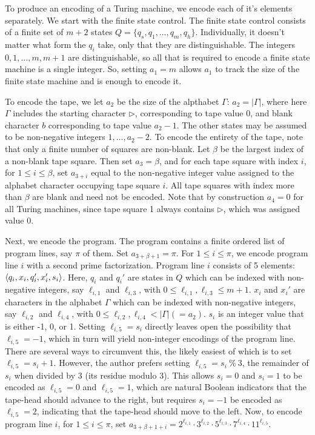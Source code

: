 To produce an encoding of a Turing machine, we encode each of it's elements separately.  We start with the finite state control.  The finite state control consists of a finite set of $m+2$ states $Q = \{q_s, q_1, \ldots, q_m, q_h\}$.  Individually, it doesn't matter what form the $q_i$ take, only that they are distinguishable.  The integers $0, 1,\ldots, m, m+1$ are distinguishable, so all that is required to encode a finite state machine is a single integer.  So, setting $a_1=m$  allows $a_1$ to track the size of the finite state machine and is enough to encode it.

To encode the tape, we let $a_2$ be the size of the alpthabet $\Gamma$: $a_2 = |\Gamma|$, where here $\Gamma$  includes the starting character $\triangleright$, corresponding to tape value 0, and blank character $b$ corresponding to tape value $a_2-1$.  The other states may be assumed to be non-negative integers $1, \ldots, a_2-2$.  To encode the entirety of the tape, note that only a finite number of squares are non-blank.  Let $\beta$ be the largest index of a non-blank tape square.  Then set $a_3 = \beta$, and for each tape square with index $i$, for $1\leq i\leq \beta$, set $a_{3+i}$ equal to the non-negative integer value assigned to the alphabet character occupying tape square $i$.  All tape squares with index more than $\beta$ are blank and need not be encoded.   Note that by construction $a_4=0$ for all Turing machines, since tape square 1 always contains $\triangleright$, which was assigned value 0.  

Next, we encode the program.    The program contains a finite ordered list of program lines, say $\pi$ of them.  Set $a_{3+\beta+1} = \pi$.  For $1\leq i \leq \pi$, we encode program line $i$ with a second prime factorization. Program line $i$ consists of 5 elements: $\braket{q_i, x_i, q_i', x_i', s_i}$.  Here, $q_i$ and $q_i'$ are states in $Q$ which can be indexed with non-negative integers, say $\ell_{i,1}$ and $\ell_{i,3}$, with $0\leq \ell_{i,1},\ell_{i,3}\leq m+1$.  $x_i$ and $x_i'$ are characters in the alphabet $\Gamma$ which can be indexed with non-negative integers, say $\ell_{i,2}$ and $\ell_{i,4}$, with $0\leq \ell_{i,2}, \ell_{i,4} < |\Gamma| (= a_2)$.  $s_i$ is an integer value that is either -1, 0, or 1.  Setting $\ell_{i,5} = s_i$ directly leaves open the possibility that $\ell_{i,5} = -1$, which in turn will yield non-integer encodings of the program line.  There are several ways to circumvent this, the likely easiest of which is to set $\ell_{i,5} = s_i+1$. However, the author prefers setting $\ell_{i,5} = s_i~\%~3$, the remainder of $s_i$ when divided by 3 (its residue modulo 3).   This allows $s_i=0$ and $s_i=1$ to be encoded as $\ell_{i,5}=0$ and $\ell_{i,5}=1$, which are natural Boolean indicators that the tape-head should advance to the right, but requires $s_i=-1$ be encoded as $\ell_{i,5}=2$, indicating that the tape-head should move to the left.  Now, to encode program line $i$, for $1\leq i\leq \pi$, set $a_{3+\beta+1+i} = 2^{\ell_{i,1}}\cdot3^{\ell_{i,2}}\cdot5^{\ell_{i,3}}\cdot7^{\ell_{i,4}}\cdot11^{\ell_{i,5}}$.  

